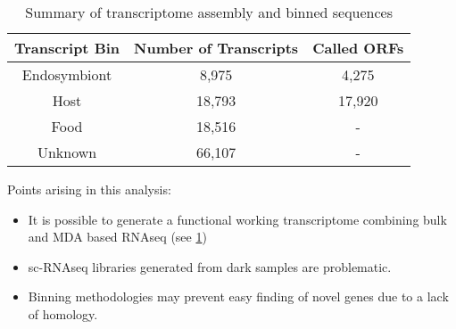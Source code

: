 \begin{table}
\centering
\begin{tabular}{|c|c|c|}
        \hline
        \textbf{Transcript Bin} & \textbf{Number of Transcripts} & \textbf{Called ORFs} \\
        \hline
        Endosymbiont  & 8,975 & 4,275 \\
        Host & 18,793 & 17,920 \\
        Food & 18,516 &  - \\
        Unknown & 66,107 & - \\
        \hline
\end{tabular}
    \caption[Summary of transcriptome bins]{Summary of transcriptome assembly and binned sequences}
    \label{tab:bin_assem_summary}
\end{table}

Points arising in this analysis:
\begin{itemize}
    \item It is possible to generate a functional working transcriptome combining bulk and MDA based RNAseq (see \cref{tab:bin_assem_summary})
    \item sc-RNAseq libraries generated from dark samples are problematic.
    \item Binning methodologies may prevent easy finding of novel genes due to a lack of homology. 
\end{itemize}


